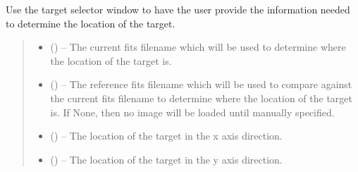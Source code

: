 \documentclass[letterpaper,11pt,english]{sphinxmanual}
\begin{document}
\begin{savenotes}\begin{fulllineitems}
\label{\detokenize{code/opihiexarata.gui.selector:opihiexarata.gui.selector.ask_user_target_selector_window}}
\pysigstartsignatures
{}
\pysigstopsignatures
\sphinxAtStartPar
Use the target selector window to have the user provide the
information needed to determine the location of the target.
\begin{quote}\begin{description}
\begin{itemize}
\item {} 
\sphinxAtStartPar
{} () – The current fits filename which will be used to determine where the
location of the target is.

\item {} 
\sphinxAtStartPar
{} (\sphinxstyleliteralemphasis{\sphinxupquote{, }}) – The reference fits filename which will be used to compare against the
current fits filename to determine where the location of the target
is. If None, then no image will be loaded until manually specified.

\end{itemize}

\sphinxAtStartPar
\begin{itemize}
\item {} 
\sphinxAtStartPar
{} () – The location of the target in the x axis direction.

\item {} 
\sphinxAtStartPar
{} () – The location of the target in the y axis direction.

\end{itemize}


\end{description}\end{quote}

\end{fulllineitems}\end{savenotes}
\end{document}
